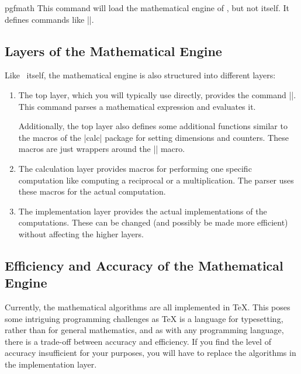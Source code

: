 \begin{package}{pgfmath}
	This command will load the mathematical engine of \pgfname, but not 
	\pgfname{} itself. It defines commands like |\pgfmathparse|.
\end{package}


\subsection{Layers of the Mathematical Engine}

Like \pgfname\ itself, the mathematical engine is also structured into
different layers:

\begin{enumerate}
\item 
	The top layer, which you will typically use directly, provides
  the command |\pgfmathparse|. This command parses a mathematical
  expression and evaluates it.

  Additionally, the top layer also defines some additional functions
  similar to the macros of the |calc| package for setting dimensions
  and counters. These macros are just wrappers around the
  |\pgfmathparse| macro.
  
\item 
	The calculation layer provides macros for performing one
  specific computation like computing a reciprocal or a
  multiplication. The parser uses these macros for the actual
  computation.
  
\item 
	The implementation layer provides the actual implementations of
  the computations. These can be changed (and possibly be made more
  efficient) without affecting the higher layers.
\end{enumerate}



\subsection{Efficiency and Accuracy of the Mathematical Engine}

Currently, the mathematical algorithms are all implemented in \TeX.
This poses some intriguing programming challenges as \TeX{} is a
language for typesetting, rather than for general mathematics,
and as with any programming language, there is a trade-off between 
accuracy and efficiency. 
If you find the level of accuracy insufficient for your
purposes, you will have to replace the algorithms in the
implementation layer.

